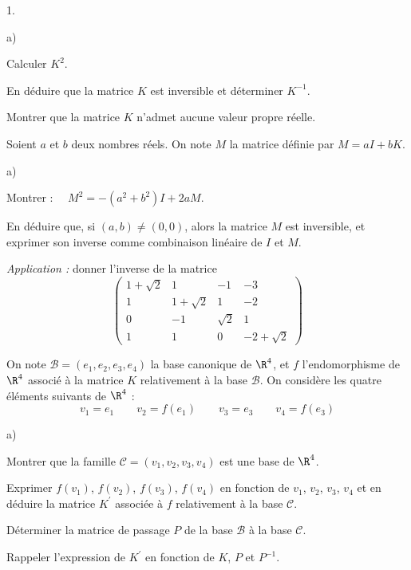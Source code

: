 \documentclass[11pt]{article}%
\begin{document}
\begin{noliste}{1.}
 \setlength{\itemsep}{4mm}
\item 
\begin{noliste}{a)}
 \setlength{\itemsep}{2mm}
\item Calculer $K^{2}$.

\item En déduire que la matrice $K$ est inversible et déterminer
$K^{-1}$.

\item Montrer que la matrice $K$ n'admet aucune valeur propre réelle.
\end{noliste}

\item Soient $a$ et $b$ deux nombres réels. On note $M$ la matrice
définie par $M = aI + bK$.

\begin{noliste}{a)}
 \setlength{\itemsep}{2mm}
\item Montrer : $\quad M^{2} = -(a^{2} + b^{2})I + 2aM$.

\item En déduire que, si $(a,b)\neq (0,0)$, alors la matrice $M$ est
inversible, et exprimer son inverse comme combinaison linéaire de $I$
et 
$M$.

\item \textsl{Application :} donner l'inverse de la matrice 
\[
\left( 
\begin{array}{rrrr}
1 + \sqrt{2} & 1 & -1 & -3 \\
1 & 1 + \sqrt{2} & 1 & -2 \\
0 & -1 & \sqrt{2} & 1 \\
1 & 1 & 0 & -2 + \sqrt{2}
\end{array}
\right) 
\]
\end{noliste}

\item On note $\mathcal{B} = (e_{1},e_{2},e_{3},e_{4})$ la base
canonique de $\R^{4}$, et $f$ l'endomorphisme de $\R^{4}$ associé à
la matrice $K$ relativement à la base $\mathcal{B}$. On considère
les quatre éléments suivants de $\R^{4}$ : 
\[
v_{1} = e_{1}\qquad v_{2} = f(e_{1})\qquad v_{3} = e_{3}\qquad v_{4} =
f(e_{3}) 
\]

\begin{noliste}{a)}
 \setlength{\itemsep}{2mm}
\item Montrer que la famille $\mathcal{C} = (v_{1},v_{2},v_{3},v_{4})$
est une
base de $\R^{4}$.

\item Exprimer $f(v_{1})$, $f(v_{2})$, $f(v_{3})$, $f(v_{4})$ en
fonction de 
$v_{1}$, $v_{2}$, $v_{3}$, $v_{4}$ et en déduire la matrice $K^{\prime
}$
associée à $f$ relativement à la base $\mathcal{C}$.

\item Déterminer la matrice de passage $P$ de la base $\mathcal{B}$ à
la base $\mathcal{C}$.

\item Rappeler l'expression de $K^{\prime }$ en fonction de $K$, $P$ et
$P^{-1}$.\newpage
\end{noliste}
\end{noliste}
\end{document}
